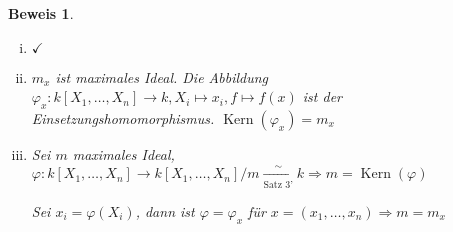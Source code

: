 \documentclass[a4paper, 12pt, numbers=noendperiod, chapterprefix=true]{scrbook}
\theoremstyle{break}
\theoremstyle{nonumberbreak}
\newtheorem{Bew}{Beweis}
\theoremstyle{nonumberplain}
\DeclareMathOperator{\Kern}{Kern}
\begin{document}
\begin{Bew}\begin{enumerate}[(iii)]
\item[(i)$\to$(ii)] $\checkmark$

\item[(ii)$\to$(iii)]
	$m_x$ ist maximales Ideal. Die Abbildung $\varphi_x:k[X_1,\dots ,X_n]\to k, X_i\mapsto x_i, f\mapsto f(x)$ ist der Einsetzungshomomorphismus. $\Kern(\varphi_x)=m_x$

\item[(iii)$\to$(i)]
	Sei $m$ maximales Ideal, $\varphi:k[X_1,\dots ,X_n]\to k[X_1,\dots ,X_n]/m  \xrightarrow[\textrm{Satz 3'}]{\sim} k \Rightarrow m=\Kern(\varphi)$
	
	Sei $x_i=\varphi(X_i)$, dann ist $\varphi=\varphi_x$ f\"ur $x=(x_1,\dots ,x_n) \Rightarrow m=m_x$
\end{enumerate}\end{Bew}
\end{document}
